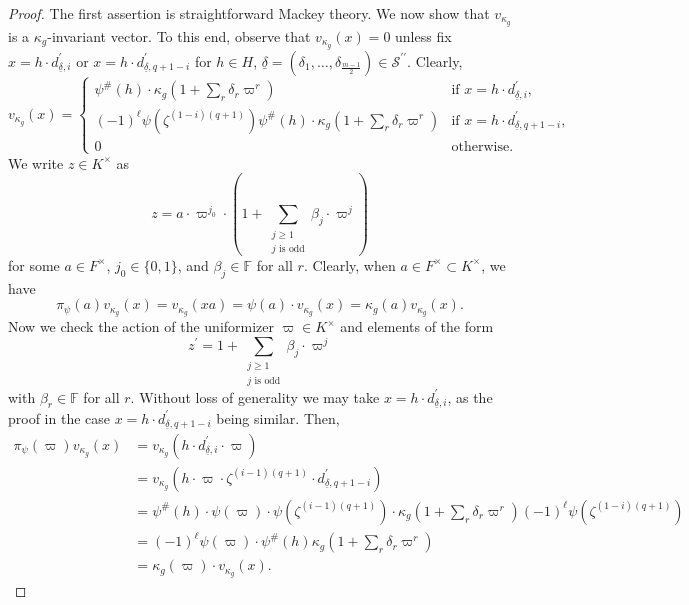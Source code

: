 \documentclass[10pt,a4paper]{amsart}
\begin{document}
\begin{proof}
The first assertion is straightforward Mackey theory. We now show that $v_{\kappa_g}$ is a $\kappa_g$-invariant vector. To this end, observe that $v_{\kappa_g}(x) = 0$ unless fix $x = h \cdot d_{\underline{\delta}, i}^\prime$ or 
$x = h \cdot d_{\underline{\delta}, {q+1-i}}^\prime$ for $h \in H$, $\underline{\delta}=(\delta_1,\dots,\delta_{\frac{m-1}{2}}) \in \mathcal S^{\prime\prime}$. Clearly,
\[
v_{\kappa_g}(x) = 
\begin{cases}
\psi^\#(h) \cdot \kappa_g(1 + \sum\limits_{r} \delta_r \varpi^r)  &\text{if $x = h \cdot d_{\underline{\delta}, i}^\prime $,} \\
(-1)^\ell \psi(\zeta^{(1-i)(q+1)}) \psi^\#(h) \cdot \kappa_g(1 + \sum\limits_{r} \delta_r \varpi^r)  &\text{if $x = h \cdot d_{\underline{\delta}, q+1-i}^\prime $,} \\
0 &\text{otherwise.}
\end{cases}
\]
We write $z \in K^\times$ as 
\[z= a \cdot \varpi^{j_0} \cdot (1 + \sum\limits_{\substack{j \geq 1  \\    j \text{ is odd} }}\beta_j \cdot  \varpi^j )\]
for some $a \in F^\times$, $j_0 \in \{0,1\}$, and $\beta_j \in \mathbb F$ for all $r$. Clearly, when $a \in F^\times \subset K^\times $, we have 
\[\pi_\psi(a) v_{\kappa_g}(x)=v_{\kappa_g}(xa)=\psi(a) \cdot v_{\kappa_g}(x) = \kappa_g(a) v_{\kappa_g}(x).\]
Now we check the action of the uniformizer $\varpi \in K^\times$ and elements of the form 
\[z^\prime = 1 + \sum\limits_{\substack{j \geq 1  \\    j \text{ is odd} }}\beta_j \cdot  \varpi^j \]
with $\beta_r \in \mathbb F$ for all $r$. Without loss of generality we may take $x =  h \cdot d_{\underline{\delta}, i}^\prime$, as the proof in the case $x =  h \cdot d_{\underline{\delta}, q+1-i}^\prime$ being similar. Then, 
\begin{align*}
\pi_\psi(\varpi) v_{\kappa_g}(x) &= v_{\kappa_g}(h \cdot d_{\underline{\delta}, i}^\prime  \cdot \varpi) \\
&= v_{\kappa_g}(h \cdot \varpi \cdot \zeta^{(i-1)(q+1)} \cdot d_{\underline{\delta}, q+1-i}^\prime) \\
&= \psi^\#(h) \cdot \psi(\varpi) \cdot \psi(\zeta^{(i-1)(q+1)}) \cdot \kappa_g(1 + \sum\limits_{r} \delta_r \varpi^r)  (-1)^\ell \psi(\zeta^{(1-i)(q+1)}) \\
&= (-1)^\ell\psi(\varpi)  \cdot  \psi^\#(h) \kappa_g(1 + \sum\limits_{r} \delta_r \varpi^r)  \\
&= \kappa_g(\varpi) \cdot v_{\kappa_g}(x).

\end{align*}
\end{proof}
\end{document}
